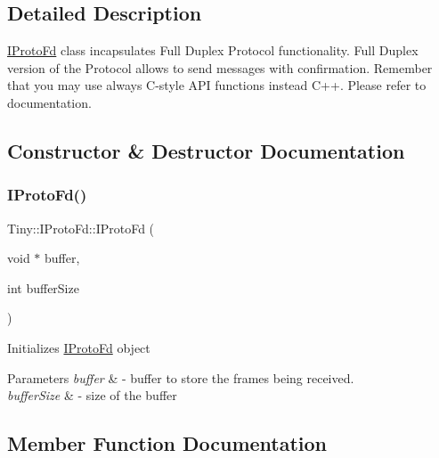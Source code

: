 \subsection{Detailed Description}
\hyperlink{classTiny_1_1IProtoFd}{I\+Proto\+Fd} class incapsulates Full Duplex Protocol functionality. Full Duplex version of the Protocol allows to send messages with confirmation. Remember that you may use always C-\/style A\+PI functions instead C++. Please refer to documentation. 

\subsection{Constructor \& Destructor Documentation}
\mbox{\label{classTiny_1_1IProtoFd_a65976c6faaf41504b7c15036edc054cf}} 
\subsubsection{\texorpdfstring{I\+Proto\+Fd()}{IProtoFd()}}
{\footnotesize\ttfamily Tiny\+::\+I\+Proto\+Fd\+::\+I\+Proto\+Fd (\begin{DoxyParamCaption}\item[{void $\ast$}]{buffer,  }\item[{int}]{buffer\+Size }\end{DoxyParamCaption})\hspace{0.3cm}{\ttfamily [inline]}}

Initializes \hyperlink{classTiny_1_1IProtoFd}{I\+Proto\+Fd} object 
\begin{DoxyParams}{Parameters}
{\em buffer} & -\/ buffer to store the frames being received. \\
\hline
{\em buffer\+Size} & -\/ size of the buffer \\
\hline
\end{DoxyParams}


\subsection{Member Function Documentation}
\mbox{\label{classTiny_1_1IProtoFd_aae4e613316866105c130d613ecb25dd4}} 
